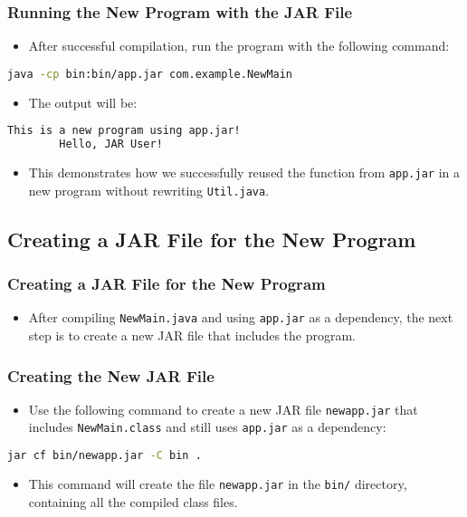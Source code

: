 \documentclass[aspectratio=169, table]{beamer}
\begin{document}
\begin{frame}[fragile]
	\frametitle{Running the New Program with the JAR File}
	\begin{itemize}
		\item After successful compilation, run the program with the following command:
	\end{itemize}
	\begin{lstlisting}[language=bash]
		java -cp bin:bin/app.jar com.example.NewMain
	\end{lstlisting}
	\begin{itemize}
		\item The output will be:
	\end{itemize}
	\begin{lstlisting}[language=bash]
		This is a new program using app.jar!
		Hello, JAR User!
	\end{lstlisting}
	\begin{itemize}
		\item This demonstrates how we successfully reused the function from \texttt{app.jar} in a new program without rewriting \texttt{Util.java}.
	\end{itemize}
\end{frame}

\subsection{Creating a JAR File for the New Program}

\begin{frame}
	\frametitle{Creating a JAR File for the New Program}
	\begin{itemize}
		\item After compiling \texttt{NewMain.java} and using \texttt{app.jar} as a dependency, the next step is to create a new JAR file that includes the program.
	\end{itemize}
\end{frame}


\begin{frame}[fragile]
	\frametitle{Creating the New JAR File}
	\begin{itemize}
		\item Use the following command to create a new JAR file \texttt{newapp.jar} that includes \texttt{NewMain.class} and still uses \texttt{app.jar} as a dependency:
	\end{itemize}
	\begin{lstlisting}[language=bash]
		jar cf bin/newapp.jar -C bin .
	\end{lstlisting}
	\begin{itemize}
		\item This command will create the file \texttt{newapp.jar} in the \texttt{bin/} directory, containing all the compiled class files.
	\end{itemize}
\end{frame}
\end{document}
